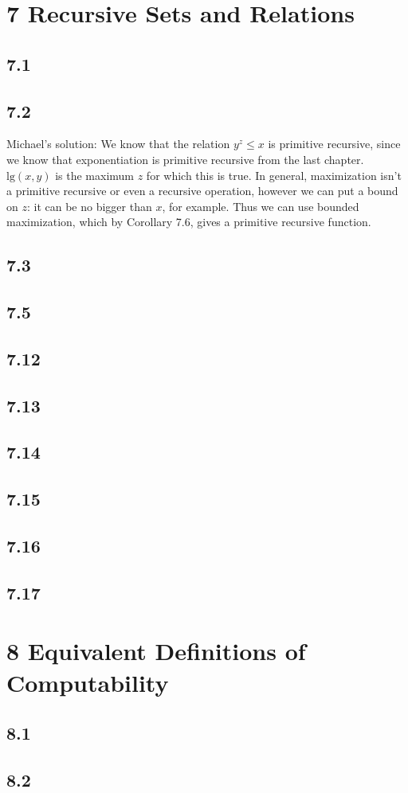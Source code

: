 \documentclass{article}
\newcommand\s{\section*}
\renewcommand\ss{\subsection*}
\newcommand\ms{Michael's solution: } %
\begin{document}
\s{7 Recursive Sets and Relations}
\ss{7.1}
\ss{7.2}
\ms We know that the relation $y^z\leq x$ is primitive recursive, since we know that exponentiation is primitive recursive from the 
last chapter.  $\mathrm{lg}(x, y)$ is the maximum $z$ for which
this is true.  In general, maximization isn't a primitive recursive or even a recursive operation, however we can put a bound on $z$: it can be no bigger than $x$, for example.  Thus we can use bounded maximization, which by Corollary 7.6, gives a primitive recursive function.
\ss{7.3}
\ss{7.5}
\ss{7.12}
\ss{7.13}
\ss{7.14}
\ss{7.15}
\ss{7.16}
\ss{7.17}

\s{8 Equivalent Definitions of Computability}
\ss{8.1}
\ss{8.2}
\end{document}
